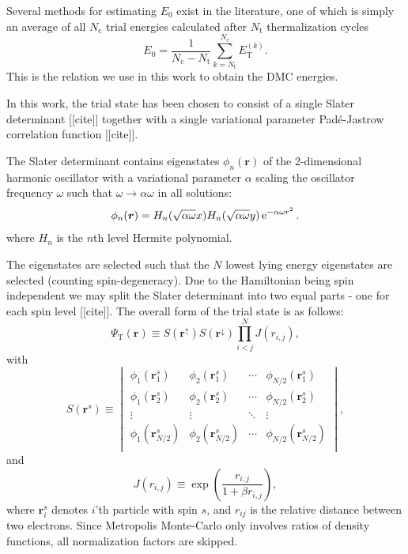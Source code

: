 Several methods for estimating $E_0$ exist in the literature, one of which is simply an average of all $N_{\mathrm{c}}$ trial energies calculated after $N_{\mathrm{t}}$ thermalization cycles
\begin{equation}
 E_0 = \frac{1}{N_{\mathrm{c}}-N_{\mathrm{t}}} \sum_{k=N_{\mathrm{t}}}^{N_{\mathrm{c}}} E_{\mathrm{T}}^{(k)}.
\end{equation}
This is the relation we use in this work to obtain the DMC energies.

In this work, the trial state has been chosen to consist of a single Slater determinant [[cite]] together with a single variational parameter Pad\'e-Jastrow correlation function [[cite]].

The Slater determinant contains eigenstates $\phi_n(\bm{r})$ of the 2-dimensional harmonic oscillator
with a variational parameter $\alpha$ scaling the oscillator frequency $\omega$
such that $\omega\to\alpha\omega$ in all solutions:
\begin{equation}
 \phi_n(\bm{r}) = H_n(\sqrt{\alpha\omega}x)H_n(\sqrt{\alpha\omega}y)\operatorname{e}^{-\alpha\omega r^2}.
\end{equation}
where $H_n$ is the $n$th level Hermite polynomial.

The eigenstates are selected such that the $N$ lowest lying energy eigenstates are selected (counting spin-degeneracy). Due to the Hamiltonian being spin independent we may split the Slater determinant into two equal parts -
one for each spin level [[cite]]. The overall form of the trial state is as follows:
\begin{equation}
 \Psi_{\mathrm{T}}(\bm{r}) \equiv S(\bm{r}^\uparrow) S(\bm{r}^\downarrow) \prod_{i<j}^{N} J(r_{i,j}),
\end{equation}
with
\begin{equation}
 S(\bm{r}^s) \equiv \begin{vmatrix}
\phi_1(\bm{r}^s_1) & \phi_2(\bm{r}^s_1)& \cdots & \phi_{N/2}(\bm{r}^s_1) \\
\phi_1(\bm{r}^s_2) & \phi_2(\bm{r}^s_2)& \cdots & \phi_{N/2}(\bm{r}^s_2) \\
\vdots & \vdots& \ddots & \vdots \\
\phi_1(\bm{r}^s_{N/2}) & \phi_2(\bm{r}^s_{N/2})& \cdots & \phi_{N/2}(\bm{r}^s_{N/2}) \\
 \end{vmatrix},
\end{equation}
and
\begin{equation}
 J(r_{i, j}) \equiv \exp\left(\frac{r_{i, j}}{1 + \beta r_{i, j}}\right),
\end{equation}
where $\bm{r}^s_i$ denotes $i$'th particle with spin $s$, and $r_{ij}$ is the relative distance between two electrons.
Since Metropolis Monte-Carlo only involves ratios of density functions, all normalization factors are skipped.

